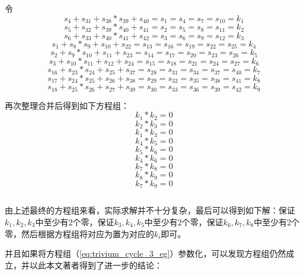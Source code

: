 令
\[s_{4}+s_{31}+s_{38}*s_{39}+s_{40}=s_{1}=s_{4}=s_{7}=s_{10}=k_{1}\]
\[s_{5}+s_{32}+s_{39}*s_{40}+s_{41}=s_{2}=s_{5}=s_{8}=s_{11}=k_{2}\]
\[s_{6}+s_{33}+s_{40}*s_{41}+s_{42}=s_{3}=s_{6}=s_{9}=s_{12}=k_{3}\]
\[s_{1}+s_{8}*s_{9}+s_{10}+s_{22}=s_{13}=s_{16}=s_{19}=s_{22}=s_{25}=k_{4}\]
\[s_{2}+s_{9}*s_{10}+s_{11}+s_{23}=s_{14}=s_{17}=s_{20}=s_{23}=s_{26}=k_{5}\]
\[s_{3}+s_{10}*s_{11}+s_{12}+s_{24}=s_{15}=s_{18}=s_{21}=s_{24}=s_{27}=k_{6}\]
\[s_{16}+s_{23}*s_{24}+s_{25}+s_{37}=s_{28}=s_{31}=s_{34}=s_{37}=s_{40}=k_{7}\]
\[s_{17}+s_{24}*s_{25}+s_{26}+s_{38}=s_{29}=s_{32}=s_{35}=s_{38}=s_{41}=k_{8}\]
\[s_{18}+s_{25}*s_{26}+s_{27}+s_{39}=s_{30}=s_{33}=s_{36}=s_{39}=s_{42}=k_{9}\]

再次整理合并后得到如下方程组：
\[k_{1}*k_{2}=0\]
\[k_{2}*k_{3}=0\]
\[k_{1}*k_{3}=0\]
\[k_{4}*k_{5}=0\]
\[k_{5}*k_{6}=0\]
\[k_{4}*k_{6}=0\]
\[k_{7}*k_{8}=0\]
\[k_{8}*k_{9}=0\]
\[k_{7}*k_{9}=0\]

\begin{equation}
\label{eq:trivium_cycle_3_eg}
\end{equation}

由上述最终的方程组来看，实际求解并不十分复杂，最后可以得到如下解：保证$k_{1},k_{2},k_{3}$中至少有2个零，保证$k_{3},k_{4},k_{5}$中至少有2个零，保证$k_{6},k_{7},k_{8}$中至少有2个零，然后根据方程组将对应为置为对应的$k_{i}$即可。

并且如果将方程组（\ref{eq:trivium_cycle_3_eg}）参数化，可以发现方程组仍然成立，并以此本文著者得到了进一步的结论：

